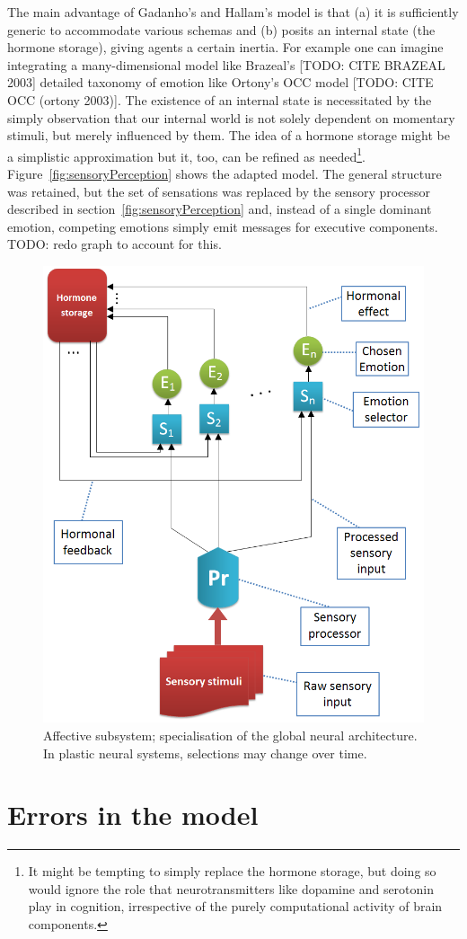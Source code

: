 \documentclass[]{scrartcl}
\begin{document}
The main advantage of Gadanho's and Hallam's model is that (a) it is sufficiently generic to accommodate various schemas and (b) posits an internal state (the hormone storage), giving agents a certain inertia. For example one can imagine integrating a many-dimensional model like Brazeal's [TODO: CITE BRAZEAL 2003] detailed taxonomy of emotion like Ortony's OCC model [TODO: CITE OCC (ortony 2003)]. The existence of an internal state is necessitated by the simply observation that our internal world is not solely dependent on momentary stimuli, but merely influenced by them. The idea of a hormone storage might be a simplistic approximation but it, too, can be refined as needed\footnote{It might be tempting to simply replace the hormone storage, but doing so would ignore the role that neurotransmitters like dopamine and serotonin play in cognition, irrespective of the purely computational activity of brain components.}. Figure~\ref{fig:sensoryPerception} shows the adapted model. The general structure was retained, but the set of sensations was replaced by the sensory processor described in section~\ref{fig:sensoryPerception} and, instead of a single dominant emotion, competing emotions simply emit messages for executive components. TODO: redo graph to account for this.

\begin{figure}[!h]
	\centering
	\includegraphics[width=400pt]{figs/affectiveSubsystem.png}
	\caption{Affective subsystem; specialisation of the global neural architecture. In plastic neural systems, selections may change over time.}
	\label{fig:affectiveSubsystem}
\end{figure}

\section{Errors in the model}\label{sec:errors}




\nocite{*}




\end{document}
